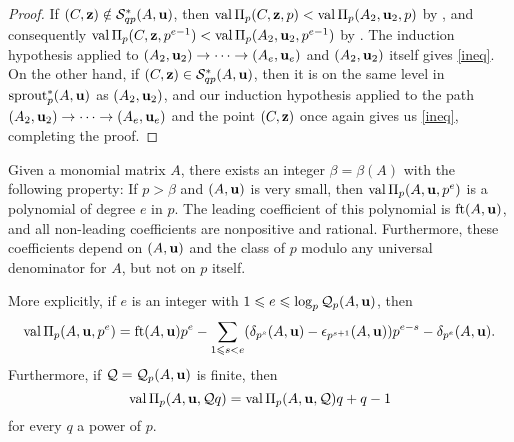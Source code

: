 \documentclass{amsart}
\begin{document}
\begin{proof}
   If $(C,\mathbf{z}) \notin \mathcal{S}^{\ast}_{qp}(A,\mathbf{u})$, then $\operatorname{val} \Pi_p(C,\mathbf{z}, p)< \operatorname{val} \Pi_p(A_2, \mathbf{u}_2, p)$ by , and consequently $\operatorname{val} \Pi_p(C, \mathbf{z},p^{e-1}) < \operatorname{val}\Pi_p(A_2,\mathbf{u}_2, p^{e-1})$ by .
   The induction hypothesis applied to $(A_2, \mathbf{u}_2) \to \cdots \to (A_e, \mathbf{u}_e)$ and $(A_2,\mathbf{u}_2)$ itself gives \eqref{ineq}.
   On the other hand, if $(C, \mathbf{z}) \in \mathcal{S}^{\ast}_{qp}(A,\mathbf{u})$, then it is on the same level in $\operatorname{sprout}_p^{\ast}(A,\mathbf{u})$ as $(A_2, \mathbf{u}_2)$, and  our induction hypothesis applied to the path $(A_2, \mathbf{u}_2) \to \cdots \to (A_e, \mathbf{u}_e)$ and the point $(C, \mathbf{z})$ once again gives us \eqref{ineq}, completing the proof.
\end{proof}

\begin{theorem}
   \label{main theorem wrt diagonal: T}
   Given a monomial matrix $A$, there exists an integer $\beta = \beta(A)$ with the following property\textup:
   If $p > \beta$ and $(A,\mathbf{u})$ is very small, then $\operatorname{val} \Pi_p(A,\mathbf{u},p^e)$ is a polynomial of degree $e$ in $p$.
   The leading coefficient of this polynomial is $\operatorname{ft}(A, \mathbf{u})$, and all non-leading coefficients are nonpositive and rational.
   Furthermore, these coefficients depend on $(A,\mathbf{u})$ and the class of $p$ modulo any universal denominator for $A$, but not on $p$ itself.

   More explicitly, if $e$ is an integer with $1 \leqslant e \leqslant \log_p \mathcal{Q}_p(A,\mathbf{u})$, then
   \[
      \operatorname{val} \Pi_p(A,\mathbf{u}, p^e) =  \operatorname{ft}(A, \mathbf{u})  p^e - \sum_{1 \leqslant s < e} ( \delta_{p^s}(A,\mathbf{u}) - \epsilon_{p^{s+1}}(A,\mathbf{u}))  p^{e-s} - \delta_{p^e}(A,\mathbf{u}).
   \]
   Furthermore, if $\mathcal{Q} = \mathcal{Q}_p(A,\mathbf{u})$ is finite, then
   \[
      \operatorname{val} \Pi_p(A,\mathbf{u}, \mathcal{Q} q) = \operatorname{val} \Pi_p(A,\mathbf{u}, \mathcal{Q})  q + q-1
   \]
   for every $q$ a power of $p$.
\end{theorem}
\end{document}

